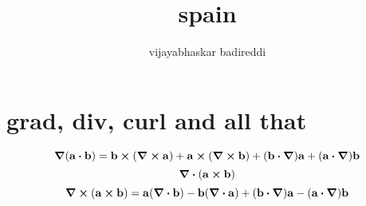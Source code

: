\documentclass[12pt]{article}
\title{spain}
\author{vijayabhaskar badireddi}
\begin{document}
    
\section*{grad, div, curl and all that}

\[\grad{\qty(\vb{a}\vdot\vb{b})}=\vb{b}\cp\qty(\curl{\vb{a}})+\vb{a}\cp\qty(\curl{\vb{b}})+\qty(\vb{b}\vdot\grad)\vb{a}+\qty(\vb{a}\vdot\grad)\vb{b}\]    
\[\div{\qty(\vb{a}\cp\vb{b})}\]
\[\curl{\qty(\vb{a}\cp\vb{b})}=\vb{a}\qty(\div{\vb{b}})-\vb{b}\qty(\div{\vb{a}})+\qty(\vb{b}\vdot\grad)\vb{a}-\qty(\vb{a}\vdot\grad)\vb{b}\]
\end{document}
